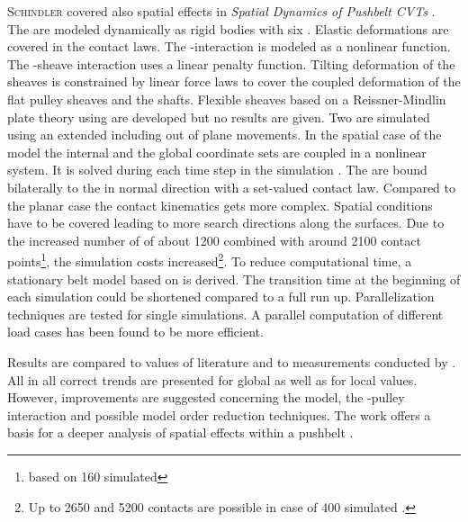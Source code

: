 \textsc{Schindler} covered also spatial effects in \emph{Spatial Dynamics of Pushbelt CVTs} \cite{schindler_analysing_2010}. 
The \els are modeled dynamically as rigid bodies with six \DOFs.
Elastic deformations are covered in the contact laws.
The \el-\el interaction is modeled as a nonlinear function.
The \el-sheave interaction uses a linear penalty function.
Tilting deformation of the sheaves is constrained by linear force laws to cover the coupled deformation of the flat pulley sheaves and the shafts.
Flexible sheaves based on a Reissner-Mindlin plate theory using \FE are developed but no results are given.
Two \rings are simulated using an extended \RCM including out of plane movements.
In the spatial case of the \RCM model the internal \FE and the global coordinate sets are coupled in a nonlinear system.
It is solved during each time step in the simulation \cite[p. 23]{schindler_spatial_2010}.
The \els are bound bilaterally to the \rings in normal direction with a set-valued contact law.
Compared to the planar case the contact kinematics gets more complex.
Spatial conditions have to be covered leading to more search directions along the surfaces.
Due to the increased number of \DOFs of about 1200 combined with around 2100 contact points\footnote{based on 160 simulated \els}, %
the simulation costs increased\footnote{Up to 2650 \DOFs and 5200 contacts are possible in case of 400 simulated \els.}.
To reduce computational time, a stationary belt model based on \cite{sattler_stationares_1999} is derived. 
The transition time at the beginning of each simulation could be shortened compared to a full run up.
Parallelization techniques are tested for single simulations.
A parallel computation of different load cases has been found to be more efficient.%
\par

Results are compared to values of literature and to measurements conducted by \Bosch.
All in all correct trends are presented for global as well as for local values.
However, improvements are suggested concerning the \ring model, the \el-pulley interaction and possible model order reduction techniques. 
The work offers a basis for a deeper analysis of spatial effects within a pushbelt \CVT.


